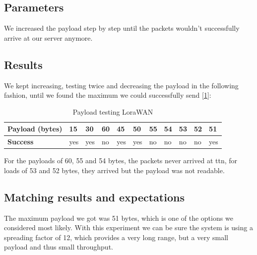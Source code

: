 	\subsection*{Parameters}
		We increased the payload step by step until the packets wouldn't successfully arrive at our server anymore.
	\subsection*{Results}
		We kept increasing, testing twice and decreasing the payload in the following fashion, until we found the maximum we could successfully send [\ref{tab:LoraWanPayload}]:

		\begin{table}[h]
			\begin{tabular}{@{}l|llllllllll@{}}
				\textbf{Payload (bytes)} & 15  & 30  & 60 & 45  & 50  & 55 & 54 & 53 & 52 & 51  \\\hline
				\textbf{Success} & yes & yes & no & yes & yes & no & no & no & no & yes
			\end{tabular}
			\caption[Payload testing LoraWAN]{Payload testing LoraWAN}
			\label{tab:LoraWanPayload}
		\end{table}

		For the payloads of 60, 55 and 54 bytes, the packets never arrived at ttn, for loads of 53 and 52 bytes, they arrived but the payload was not readable.

	\subsection*{Matching results and expectations}
		The maximum payload we got was 51 bytes, which is one of the options we considered most likely. With this experiment we can be sure the system is using a spreading factor of 12, which provides a very long range, but a very small payload and thus small throughput.

